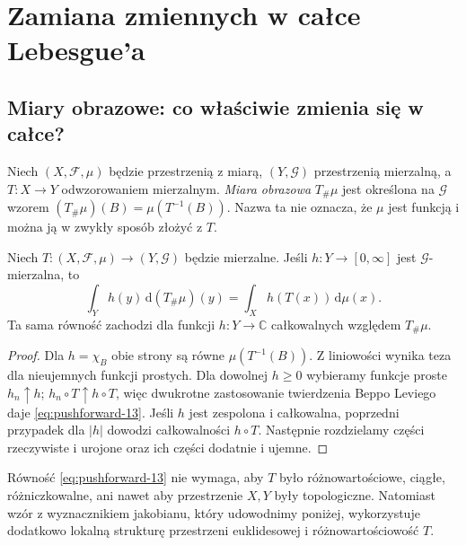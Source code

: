 \chapter{Zamiana zmiennych w całce Lebesgue'a}
\label{ch:zamiana-zmiennych}

\section{Miary obrazowe: co właściwie zmienia się w całce?}
Niech $(X,\mathcal F,\mu)$ będzie przestrzenią z miarą, $(Y,\mathcal G)$
przestrzenią mierzalną, a $T:X\to Y$ odwzorowaniem mierzalnym.
\emph{Miara obrazowa} $T_\#\mu$ jest określona na $\mathcal G$ wzorem
$(T_\#\mu)(B)=\mu(T^{-1}(B))$. Nazwa ta nie oznacza, że
$\mu$ jest funkcją i można ją w zwykły sposób złożyć z $T$.

\begin{twierdzenie}
\label{thm:pushforward-integral-13}
Niech $T:(X,\mathcal F,\mu)\to(Y,\mathcal G)$ będzie mierzalne.
Jeśli $h:Y\to[0,\infty]$ jest $\mathcal G$-mierzalna, to
\begin{equation}\label{eq:pushforward-13}
\int_Y h(y)\,\mathrm d(T_\#\mu)(y)
=\int_X h(T(x))\,\mathrm d\mu(x).
\end{equation}
Ta sama równość zachodzi dla funkcji $h:Y\to\mathbb C$
całkowalnych względem $T_\#\mu$.
\end{twierdzenie}
\begin{proof}
Dla $h=\chi_B$ obie strony są równe $\mu(T^{-1}(B))$.
Z liniowości wynika teza dla nieujemnych funkcji prostych.
Dla dowolnej $h\ge0$ wybieramy funkcje proste $h_n\uparrow h$;
$h_n\circ T\uparrow h\circ T$, więc dwukrotne zastosowanie
twierdzenia Beppo Leviego daje \eqref{eq:pushforward-13}.
Jeśli $h$ jest zespolona i całkowalna, poprzedni przypadek dla
$|h|$ dowodzi całkowalności $h\circ T$. Następnie rozdzielamy
części rzeczywiste i urojone oraz ich części dodatnie i ujemne.
\end{proof}

\begin{uwaga}
Równość \eqref{eq:pushforward-13} nie wymaga, aby $T$ było
różnowartościowe, ciągłe, różniczkowalne, ani nawet aby przestrzenie
$X,Y$ były topologiczne. Natomiast wzór z wyznacznikiem jakobianu,
który udowodnimy poniżej, wykorzystuje dodatkowo lokalną strukturę
przestrzeni euklidesowej i różnowartościowość $T$.
\end{uwaga}


